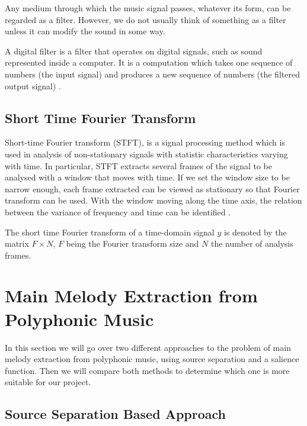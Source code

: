 Any medium through which the music signal passes, whatever its form, can be regarded as a filter. However, we do not usually think of something as a filter unless it can modify the sound in some way. 

A digital filter is a filter that operates on digital signals, such as sound represented inside a computer. It is a computation which takes one sequence of numbers (the input signal) and produces a new sequence of numbers (the filtered output signal) \cite{filters}.

\vspace{10pt}

\subsection{Short Time Fourier Transform}

Short-time Fourier transform (STFT), is a signal processing method which is used in analysis of non-stationary signals with statistic characteristics varying with time.
In particular, STFT extracts several frames of the signal to be analysed with a window that moves with time. If we set the window size to be narrow enough, each frame extracted can be viewed as stationary so that Fourier transform can be used. With the window moving along the time axis, the relation between the variance of frequency and time can be identified \cite{STFT}.

The short time Fourier transform of a time-domain signal $y$ is denoted by the matrix $F \times N$, $F$ being the Fourier transform size and $N$ the number of analysis frames.

\vspace{20pt}

\section{Main Melody Extraction from Polyphonic Music}
In this section we will go over two different approaches to the problem of main melody extraction from polyphonic music, using source separation and a salience function. Then we will compare both methods to determine which one is more suitable for our project.

\vspace{10pt}

\subsection{Source Separation Based Approach}

